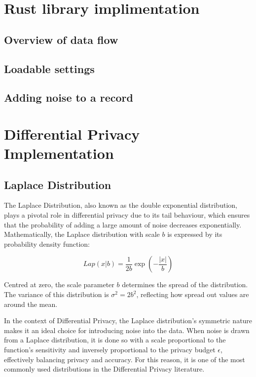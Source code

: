\section{Rust library implimentation}
\subsection{Overview of data flow}
\subsection{Loadable settings}
\subsection{Adding noise to a record}

\section{Differential Privacy Implementation}
\subsection{Laplace Distribution}

The Laplace Distribution, also known as the double exponential distribution, plays a pivotal role in differential privacy due to its tail behaviour, which ensures that the probability of adding a large amount of noise decreases exponentially. Mathematically, the Laplace distribution with scale $b$ is expressed by its probability density function:

\begin{equation}
Lap(x|b) = \frac{1}{2b} \exp\left(-\frac{|x|}{b}\right)
\end{equation}\citep[Def. 3.2]{Dwork2014}

Centred at zero, the scale parameter $b$ determines the spread of the distribution. The variance of this distribution is $ \sigma^2 = 2b^2 $, reflecting how spread out values are around the mean\citep[p. 31]{Dwork2014}.

In the context of Differential Privacy, the Laplace distribution's symmetric nature makes it an ideal choice for introducing noise into the data. When noise is drawn from a Laplace distribution, it is done so with a scale proportional to the function's sensitivity and inversely proportional to the privacy budget $\epsilon$, effectively balancing privacy and accuracy\citep[p. 31]{Dwork2014}. For this reason, it is one of the most commonly used distributions in the Differential Privacy literature. 

